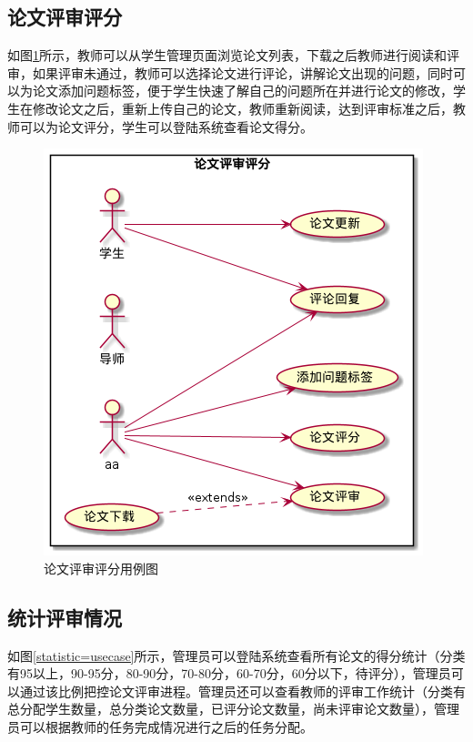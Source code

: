 \subsection{论文评审评分}

如图\ref{scoring-usecase}所示，教师可以从学生管理页面浏览论文列表，下载之后教师进行阅读和评审，如果评审未通过，教师可以选择论文进行评论，讲解论文出现的问题，同时可以为论文添加问题标签，便于学生快速了解自己的问题所在并进行论文的修改，学生在修改论文之后，重新上传自己的论文，教师重新阅读，达到评审标准之后，教师可以为论文评分，学生可以登陆系统查看论文得分。

\begin{figure}[H]
    \centering
    \includegraphics[scale = 0.6]{out/uml/用例图/3-论文评审评分/3-论文评审评分.png}
    \caption{\song\wuhao 论文评审评分用例图}
    \label{scoring-usecase}
\end{figure}

\subsection{统计评审情况}

如图\ref{statistic=usecase}所示，管理员可以登陆系统查看所有论文的得分统计（分类有95以上，90-95分，80-90分，70-80分，60-70分，60分以下，待评分），管理员可以通过该比例把控论文评审进程。管理员还可以查看教师的评审工作统计（分类有总分配学生数量，总分类论文数量，已评分论文数量，尚未评审论文数量），管理员可以根据教师的任务完成情况进行之后的任务分配。

